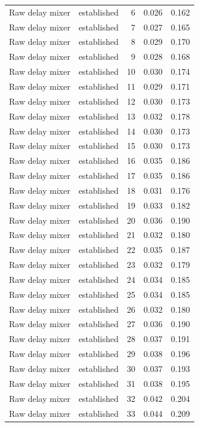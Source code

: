 \begin{tabular}{llrrr}
Raw delay mixer & established & 6 & 0.026 & 0.162 \\
Raw delay mixer & established & 7 & 0.027 & 0.165 \\
Raw delay mixer & established & 8 & 0.029 & 0.170 \\
Raw delay mixer & established & 9 & 0.028 & 0.168 \\
Raw delay mixer & established & 10 & 0.030 & 0.174 \\
Raw delay mixer & established & 11 & 0.029 & 0.171 \\
Raw delay mixer & established & 12 & 0.030 & 0.173 \\
Raw delay mixer & established & 13 & 0.032 & 0.178 \\
Raw delay mixer & established & 14 & 0.030 & 0.173 \\
Raw delay mixer & established & 15 & 0.030 & 0.173 \\
Raw delay mixer & established & 16 & 0.035 & 0.186 \\
Raw delay mixer & established & 17 & 0.035 & 0.186 \\
Raw delay mixer & established & 18 & 0.031 & 0.176 \\
Raw delay mixer & established & 19 & 0.033 & 0.182 \\
Raw delay mixer & established & 20 & 0.036 & 0.190 \\
Raw delay mixer & established & 21 & 0.032 & 0.180 \\
Raw delay mixer & established & 22 & 0.035 & 0.187 \\
Raw delay mixer & established & 23 & 0.032 & 0.179 \\
Raw delay mixer & established & 24 & 0.034 & 0.185 \\
Raw delay mixer & established & 25 & 0.034 & 0.185 \\
Raw delay mixer & established & 26 & 0.032 & 0.180 \\
Raw delay mixer & established & 27 & 0.036 & 0.190 \\
Raw delay mixer & established & 28 & 0.037 & 0.191 \\
Raw delay mixer & established & 29 & 0.038 & 0.196 \\
Raw delay mixer & established & 30 & 0.037 & 0.193 \\
Raw delay mixer & established & 31 & 0.038 & 0.195 \\
Raw delay mixer & established & 32 & 0.042 & 0.204 \\
Raw delay mixer & established & 33 & 0.044 & 0.209 \\

\end{tabular}
